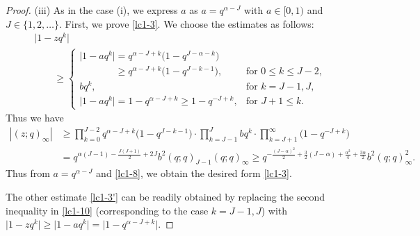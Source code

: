 \documentclass[pdftex]{sigma}
\numberwithin{equation}{section}
\def\a{\alpha}
\def\i{\infty}
\begin{document}
\begin{proof}
 (iii)
 As in the case (i),
 we express $a$ as $a=q^{\a-J}$ with $a\in[0,1)$ and $J\in\{1,2,\dots\}$.
 First, we prove \eqref{lc1-3}.
 We choose the estimates as follows:
 \begin{gather}
 \big|1-z q^k\big|\nonumber
 \\
 \qquad\ge
 \begin{cases}
 \big|1-a q^k\big|=q^{\a-J+k}\big(1-q^{J-\a-k}\big)&\\
 \phantom{ \big|1-a q^k\big|}{} \ge q^{\a-J+k}\big(1-q^{J-k-1}\big), & {\text{for $0\le k\le J-2$}},
 \\
 bq^k, & {\text{for $k=J-1,J$}},
 \\
 \big|1-a q^k\big|=1-q^{\a-J+k}\ge 1-q^{-J+k}, & {\text{for $J+1\le k$}}.
 \end{cases}\label{lc1-10}
 \end{gather}
 Thus we have
 \begin{align*}%
 |(z;q)_{\i}|
 &\ge
 \prod_{k=0}^{J-2} q^{\a-J+k}\big(1-q^{J-k-1}\big)
 \cdot
 \prod_{k=J-1}^{J} bq^{k}
 \cdot
 \prod_{k=J+1}^{\i} \big(1-q^{-J+k}\big)
 \\
 &=
 q^{\a(J-1)-\frac{J(J+1)}{2}+2J}b^2(q;q)_{J-1}(q;q)_{\infty}\ge
 q^{-\frac{(J-\alpha)^2}{2}+\frac32(J-\alpha)+\frac{\alpha^2}{4}+\frac{3\alpha}{2}}b^2(q;q)_{\infty}^2.
 \end{align*}
 Thus from $a=q^{\alpha-J}$ and \eqref{lc1-8}, we
 obtain the desired form \eqref{lc1-3}.

 The other estimate \eqref{lc1-3'}
 can be readily
 obtained by replacing the second inequality in \eqref{lc1-10}
 (corresponding to the case $k=J-1, J$)
 with $\big|1-zq^k\big|\ge \big|1-aq^k\big|=\big|1-q^{\a-J+k}\big|$.
\end{proof}
\end{document}
